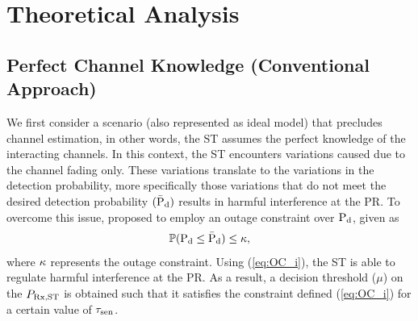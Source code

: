 \section{Theoretical Analysis} \label{sec:th_ana}

\subsection{Perfect Channel Knowledge (Conventional Approach)} \label{ssec:pce}
We first consider a scenario (also represented as ideal model) that precludes channel estimation, in other words, the ST assumes the perfect knowledge of the interacting channels. In this context, the ST encounters variations caused due to the channel fading only. These variations translate to the variations in the detection probability, more specifically those variations that do not meet the desired detection probability $(\bar{\text{P}}_{\text{d}})$ results in harmful interference at the PR. To overcome this issue, \cite{Juarez11} proposed to employ an outage constraint over $\text{P}_{\text{d}}$, given as
\begin{align}
\p( \pd \le \pdd) \le \mpd, \label{eq:OC_i}
\end{align} 
where $\kappa$ represents the outage constraint. Using (\ref{eq:OC_i}), the ST is able to regulate harmful interference at the PR. As a result, a decision threshold ($\mu$) on the $P_{\text{Rx,ST}}$ is obtained such that it satisfies the constraint defined (\ref{eq:OC_i}) for a certain value of $\tau_{\text{sen}}$. 

